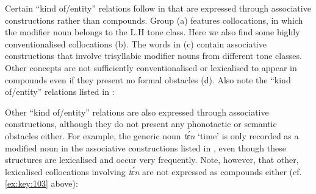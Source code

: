 Certain “kind of/entity” relations follow in  that are expressed through associative constructions rather than compounds. Group (a) features collocations, in which the modifier noun belongs to the L.H tone class. Here we also find some highly conventionalised collocations (b). The words in (c) contain associative constructions that involve trisyllabic modifier nouns from different tone classes. Other concepts are not sufficiently conventionalised or lexicalised to appear in compounds even if they present no formal obstacles (d). Also note the “kind of/entity” relations listed in : 

Other “kind of/entity” relations are also expressed through associative constructions, although they do not present any phonotactic or semantic obstacles either. For example, the generic noun \textit{tɛ́n} ‘time’ is only recorded as a modified noun in the associative constructions listed in , even though these structures are lexicalised and occur very frequently. Note, however, that other, lexicalised collocations involving \textit{tɛ́n} are not expressed as compounds either (cf. \ref{ex:key:103} above):

